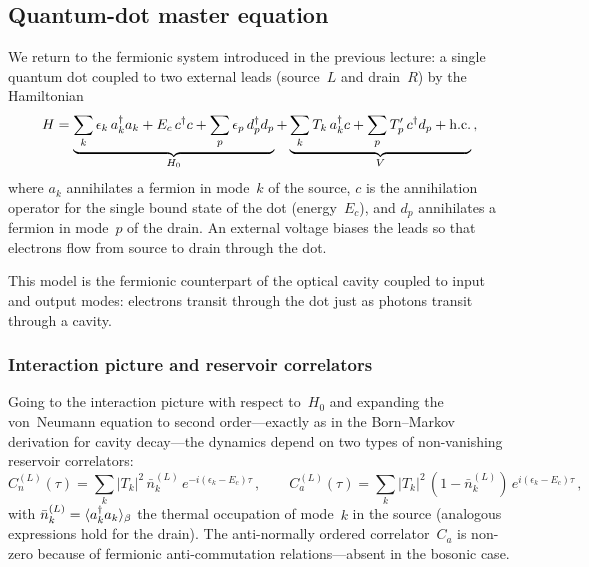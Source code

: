 

\subsection{Quantum-dot master equation}\label{sec:dot-master-eq}

We return to the fermionic system introduced in the previous lecture:
a single quantum dot coupled to two external leads (source~$L$ and
drain~$R$) by the Hamiltonian
\begin{equation}\label{eq:dot-hamiltonian}
  H = \underbrace{%
    \sum_{k}\epsilon_k\, a_k^\adj a_k
    + E_c\, c^\adj c
    + \sum_{p}\epsilon_p\, d_p^\adj d_p}_{H_0}
  + \underbrace{%
    \sum_{k} T_k\, a_k^\adj c
    + \sum_{p} T_p^{\prime}\, c^\adj d_p
    + \text{h.c.}}_{V}\,,
\end{equation}
where $a_k$ annihilates a fermion in mode~$k$ of the source, $c$ is
the annihilation operator for the single bound state of the dot
(energy~$E_c$), and $d_p$ annihilates a fermion in mode~$p$ of the
drain.  An external voltage biases the leads so that electrons flow
from source to drain through the dot.

\begin{intuition}
  This model is the fermionic counterpart of the optical cavity
  coupled to input and output modes: electrons transit through the
  dot just as photons transit through a cavity.
\end{intuition}

\subsubsection{Interaction picture and reservoir correlators}

Going to the interaction picture with respect to~$H_0$ and expanding
the von~Neumann equation to second order---exactly as in the
Born--Markov derivation for cavity decay---the dynamics depend on two
types of non-vanishing reservoir correlators:
\begin{equation}\label{eq:correlators}
  C_n^{(L)}(\tau)
  = \sum_k \lvert T_k\rvert^2\,
    \bar{n}_k^{(L)}\, e^{-i(\epsilon_k - E_c)\tau}\,,
  \qquad
  C_a^{(L)}(\tau)
  = \sum_k \lvert T_k\rvert^2\,
    (1-\bar{n}_k^{(L)})\, e^{i(\epsilon_k - E_c)\tau}\,,
\end{equation}
with $\bar{n}_k^{(L)} = \langle a_k^\dagger a_k \rangle_\beta$ the thermal
occupation of mode~$k$ in the source (analogous expressions hold for
the drain).  The anti-normally ordered correlator~$C_a$ is non-zero
because of fermionic anti-commutation relations---absent in the
bosonic case.

